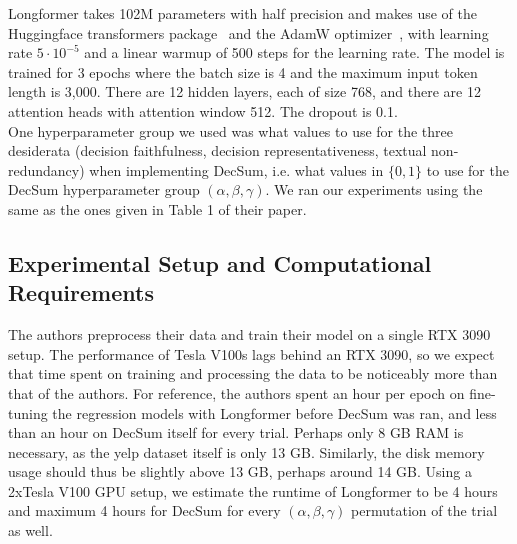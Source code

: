 \documentclass{article}
\begin{document}
Longformer takes 102M parameters with half precision and makes use of the Huggingface transformers package~\cite{wolf-etal-2020-transformers} and the
AdamW optimizer~\cite{DBLP:journals/corr/abs-1711-05101}, with learning rate $5\cdot 10^{-5}$ and a linear warmup of 500 steps for the learning rate. The model is trained for 3 epochs where
the batch size is 4 and the maximum input token length is 3,000. There are 12 hidden layers, each of size 768, and there are 12 attention heads with attention window 512. The dropout is 0.1. \\

One hyperparameter group we used was what values to use for the three desiderata (decision faithfulness, decision representativeness, textual non-redundancy) when implementing DecSum, i.e.
what values in $\{0,1\}$ to use for the DecSum hyperparameter group $(\alpha, \beta, \gamma)$.
We ran our experiments using the same as the ones given in Table 1 of their paper.

\subsection{Experimental Setup and Computational Requirements}
The authors preprocess their data and train their model on a single RTX 3090 setup. The performance of Tesla V100s lags behind an RTX 3090, so we expect that time spent on
training and processing the data to be noticeably more than that of the authors. For reference, the authors spent an hour per epoch on fine-tuning the regression models with Longformer
before DecSum was ran, and less than an hour on DecSum itself for every trial.
Perhaps only 8 GB RAM is necessary, as the yelp dataset itself is only 13 GB.
Similarly, the disk memory usage should thus be slightly above 13 GB, perhaps around 14 GB.
Using a 2xTesla V100 GPU setup, we estimate the runtime of Longformer to be 4 hours and maximum 4 hours for DecSum for every $(\alpha, \beta, \gamma)$ permutation of the trial as well. \\
\end{document}
